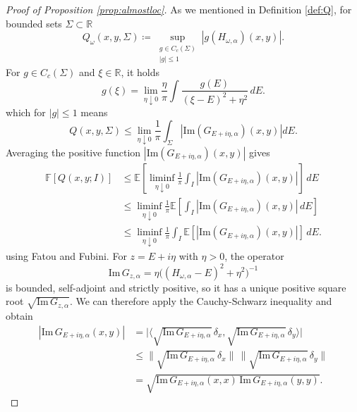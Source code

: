 \documentclass[11pt, a4paper, UKenglish, oneside]{book}
\theoremstyle{plain}
\theoremstyle{remark}
\theoremstyle{definition}
\numberwithin{equation}{section}
\numberwithin{theorem}{section}
\begin{document}
\begin{proof}[Proof of Proposition \ref{prop:almostloc}]
    As we mentioned in Definition \ref{def:Q}, for bounded sets $\Sigma \subset \mathbb{R}$ $$Q_\omega(x,y,\Sigma) \coloneqq \sup_{\substack{g \in C_c(\Sigma) \\ |g| \le 1}} | g(H_{\omega,\alpha})(x,y)|.$$ For $g \in C_c(\Sigma)$ and $\xi \in \mathbb{R}$, it holds
    \begin{equation*}
    g(\xi) = \lim_{\eta \downarrow 0} \frac{\eta}{\pi} \int \frac{g(E)}{(\xi - E)^2 + \eta^2} \, dE.
    \end{equation*}
    which for $|g| \le 1$ means
    \begin{equation}
        Q(x,y, \Sigma) \le \lim_{\eta \downarrow 0} \frac{1}{\pi} \int_{\Sigma} |\mathrm{Im}(G_{E + i\eta,\alpha})(x,y) | dE.
    \end{equation}
    Averaging the positive function $|\mathrm{Im}(G_{E + i\eta,\alpha})(x,y) |$ gives
    \begin{align} \label{eq:7.29}
        \mathbb{F}[Q(x,y;I) ]&\le \mathbb{E} \left[\liminf_{\eta \downarrow 0} \frac{1}{\pi} \int_I |\mathrm{Im}(G_{E + i\eta,\alpha})(x,y)|\right] \, dE\\ \nonumber
        &\le \liminf_{\eta \downarrow 0} \frac{1}{\pi}\mathbb{E} \left[ \int_I |\mathrm{Im}(G_{E + i\eta,\alpha})(x,y)| \, dE\right]\\ \nonumber
        &\le \liminf_{\eta \downarrow 0} \frac{1}{\pi} \int_I \mathbb{E}[|\mathrm{Im}(G_{E + i\eta,\alpha})(x,y)|] \, dE.
    \end{align}
    using Fatou and Fubini.
    For $z=E+i\eta$ with $\eta>0$, the operator
    \[
    \mathrm{Im}\,G_{z,\alpha}= \eta\bigl((H_{\omega,\alpha}-E)^2+\eta^2\bigr)^{-1}
    \]
    is bounded, self-adjoint and strictly positive, so it has a unique positive square root
    $\sqrt{\mathrm{Im}\,G_{z,\alpha}}$.
    We can therefore apply the Cauchy-Schwarz inequality and obtain 
    \begin{align}\label{eq:7.30}
    |\mathrm{Im}\,G_{E+i\eta,\alpha}(x,y)|
    &= \bigl|\langle\sqrt{\mathrm{Im}\,G_{E+i\eta,\alpha}}\,\delta_x,\sqrt{\mathrm{Im}\,G_{E+i\eta,\alpha}}\,\delta_y\rangle\bigr| \\
    &\le \bigl\|\sqrt{\mathrm{Im}\,G_{E+i\eta,\alpha}}\,\delta_x\bigr\|\,\bigl\|\sqrt{\mathrm{Im}\,G_{E+i\eta,\alpha}}\,\delta_y\bigr\| \nonumber\\
    &= \sqrt{\mathrm{Im}\,G_{E+i\eta,\alpha}(x,x)\,\mathrm{Im}\,G_{E+i\eta,\alpha}(y,y)}. \nonumber
    \end{align}

\end{proof}
\end{document}
